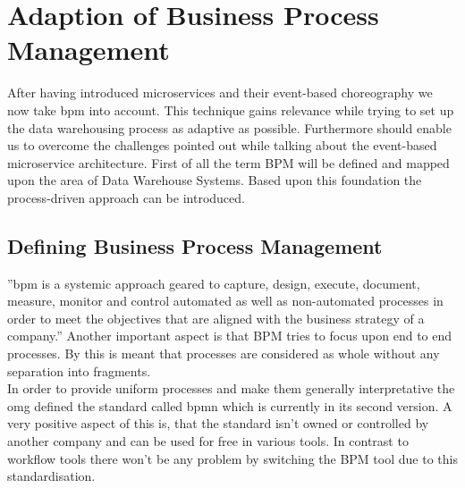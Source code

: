 \section{Adaption of Business Process Management}
\label{sec:bpm}
After having introduced microservices and their event-based choreography we now take \acrfull{bpm} into account. This technique gains relevance while trying to set up the data warehousing process as adaptive as possible. Furthermore should enable us to overcome the challenges pointed out while talking about the event-based microservice architecture.\newline
First of all the term BPM will be defined and mapped upon the area of Data Warehouse Systems. Based upon this foundation the process-driven approach can be introduced. 

\subsection{Defining Business Process Management}
''\acrfull{bpm} is a systemic approach geared to capture, design, execute, document, measure, monitor and control automated as well as non-automated processes in order to meet the objectives that are aligned with the business strategy of a company.'' \cite{bpmDef} Another important aspect is that BPM tries to focus upon end to end processes. By this is meant that processes are considered as whole without any separation into fragments.\cite{praxisBPM}\newline
\\
In order to provide uniform processes and make them generally interpretative the \acrfull{omg} defined the standard called \acrfull{bpmn} which is currently in its second version. A very positive aspect of this is, that the standard isn't owned or controlled by another company and can be used for free in various tools. In contrast to workflow tools there won't be any problem by switching the BPM tool due to this standardisation. \cite{bpmMethodStyle}

